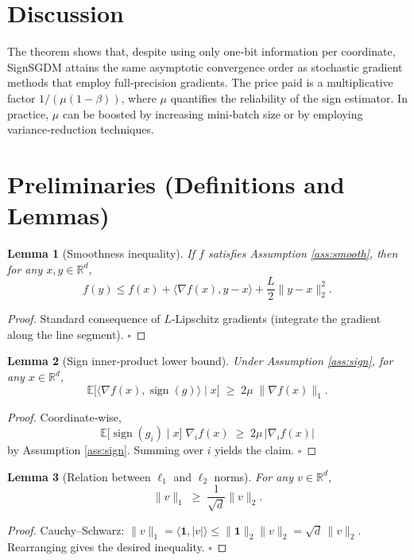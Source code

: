 \documentclass{article}
\newtheorem{lemma}{Lemma}
\newcommand{\sign}{\operatorname{sign}}
\newcommand{\E}{\mathbb{E}}
\newcommand{\R}{\mathbb{R}}
\begin{document}
\section*{Discussion}
The theorem shows that, despite using only one‑bit information per coordinate, SignSGDM attains the same asymptotic convergence order as stochastic gradient methods that employ full‑precision gradients. The price paid is a multiplicative factor $1/( \mu (1-\beta))$, where $\mu$ quantifies the reliability of the sign estimator. In practice, $\mu$ can be boosted by increasing mini‑batch size or by employing variance‑reduction techniques.

\newpage

\section*{Preliminaries (Definitions and Lemmas)}
\begin{lemma}[Smoothness inequality]
\label{lem:smooth}
If $f$ satisfies Assumption \ref{ass:smooth}, then for any $x,y\in\R^{d}$,
\[
f(y)\le f(x)+\langle\nabla f(x),y-x\rangle+\frac{L}{2}\|y-x\|_2^{2}.
\]
\end{lemma}
\begin{proof}
Standard consequence of $L$‑Lipschitz gradients (integrate the gradient along the line segment). \hfill $\square$
\end{proof}

\begin{lemma}[Sign inner‑product lower bound]
\label{lem:sign}
Under Assumption \ref{ass:sign}, for any $x\in\R^{d}$,
\[
\E\!\bigl[\langle\nabla f(x),\sign(g)\rangle\mid x\bigr]\;\ge\;2\mu\;\|\nabla f(x)\|_{1}.
\]
\end{lemma}
\begin{proof}
Coordinate‑wise,
\[
\E\!\bigl[\sign(g_i)\mid x\bigr]\;\nabla_i f(x)
\;\ge\;2\mu\,|\nabla_i f(x)|
\]
by Assumption \ref{ass:sign}. Summing over $i$ yields the claim. \hfill $\square$
\end{proof}

\begin{lemma}[Relation between $\ell_1$ and $\ell_2$ norms]
\label{lem:l1l2}
For any $v\in\R^{d}$,
\[
\|v\|_{1}\;\ge\;\frac{1}{\sqrt{d}}\|v\|_{2}.
\]
\end{lemma}
\begin{proof}
Cauchy–Schwarz: $\|v\|_{1}= \langle \mathbf{1},|v|\rangle\le \|\mathbf{1}\|_{2}\|v\|_{2}= \sqrt{d}\,\|v\|_{2}$. Rearranging gives the desired inequality. \hfill $\square$
\end{proof}
\end{document}
